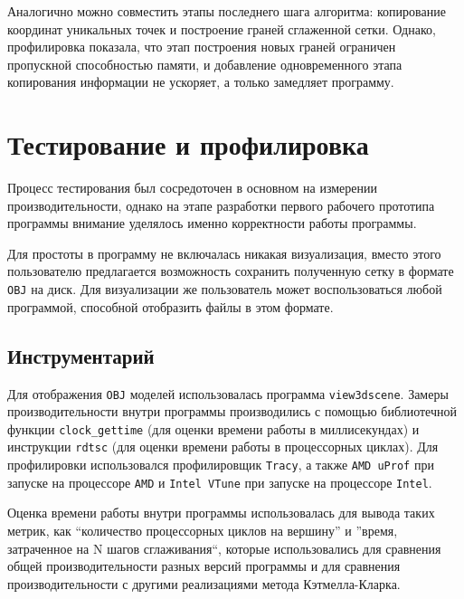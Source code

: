 \documentclass[14pt]{extarticle}
\begin{document}
Аналогично можно совместить этапы последнего шага алгоритма: копирование координат уникальных точек и построение граней сглаженной сетки. Однако, профилировка показала, что этап построения новых граней ограничен пропускной способностью памяти, и добавление одновременного этапа копирования информации не ускоряет, а только замедляет программу.

\newpage
\section{Тестирование и профилировка}
Процесс тестирования был сосредоточен в основном на измерении производительности, однако на этапе разработки первого рабочего прототипа программы внимание уделялось именно корректности работы программы. 

Для простоты в программу не включалась никакая визуализация, вместо этого пользователю предлагается возможность сохранить полученную сетку в формате \texttt{OBJ} на диск. Для визуализации же пользователь может воспользоваться любой программой, способной отобразить файлы в этом формате.

\subsection{Инструментарий}
Для отображения \texttt{OBJ} моделей использовалась программа \texttt{view3dscene}. Замеры производительности внутри программы производились с помощью библиотечной функции \texttt{clock\_gettime} (для оценки времени работы в миллисекундах) и инструкции \texttt{rdtsc} (для оценки времени работы в процессорных циклах). Для профилировки использовался профилировщик \texttt{Tracy}, а также \texttt{AMD uProf} при запуске на процессоре \texttt{AMD} и \texttt{Intel VTune}
\cite{kasper03} при запуске на процессоре \texttt{Intel}.

Оценка времени работы внутри программы использовалась для вывода таких метрик, как ``количество процессорных циклов на вершину'' и ''время, затраченное на N шагов сглаживания``, которые использовались для сравнения общей производительности разных версий программы и для сравнения производительности с другими реализациями метода Кэтмелла-Кларка.
\end{document}
